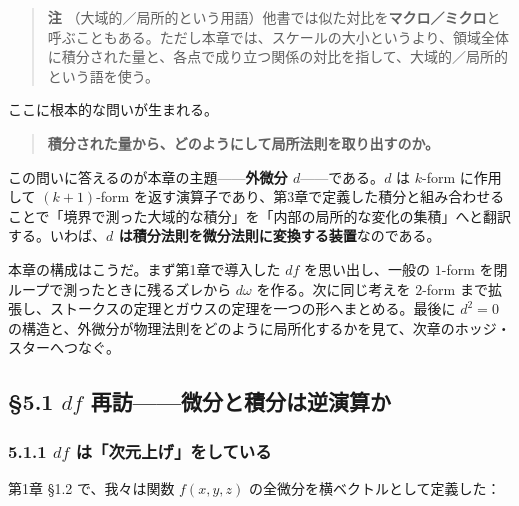 \documentclass[a4paper,12pt,openany]{book}
\begin{document}
\begin{quote}
\textbf{注}
（大域的／局所的という用語）他書では似た対比を\textbf{マクロ／ミクロ}と呼ぶこともある。ただし本章では、スケールの大小というより、領域全体に積分された量と、各点で成り立つ関係の対比を指して、大域的／局所的という語を使う。
\end{quote}

ここに根本的な問いが生まれる。

\begin{quote}
\textbf{積分された量から、どのようにして局所法則を取り出すのか。}
\end{quote}

この問いに答えるのが本章の主題——\textbf{外微分 $d$}——である。\(d\)
は \(k\)-form に作用して \((k+1)\)-form
を返す演算子であり、第3章で定義した積分と組み合わせることで「境界で測った大域的な積分」を「内部の局所的な変化の集積」へと翻訳する。いわば、\textbf{$d$ は積分法則を微分法則に変換する装置}なのである。

本章の構成はこうだ。まず第1章で導入した \(df\) を思い出し、一般の
\(1\)-form を閉ループで測ったときに残るズレから \(d\omega\)
を作る。次に同じ考えを \(2\)-form
まで拡張し、ストークスの定理とガウスの定理を一つの形へまとめる。最後に
\(d^2=0\)
の構造と、外微分が物理法則をどのように局所化するかを見て、次章のホッジ・スターへつなぐ。

\par\vspace{0.35em}\par

\hypertarget{df-ux518dux8a2aux5faeux5206ux3068ux7a4dux5206ux306fux9006ux6f14ux7b97ux304b}{%
\subsection{\texorpdfstring{§5.1 \(df\)
再訪——微分と積分は逆演算か}{§5.1 df 再訪——微分と積分は逆演算か}}\label{df-ux518dux8a2aux5faeux5206ux3068ux7a4dux5206ux306fux9006ux6f14ux7b97ux304b}}

\hypertarget{df-ux306fux6b21ux5143ux4e0aux3052ux3092ux3057ux3066ux3044ux308b}{%
\subsubsection{\texorpdfstring{5.1.1 \(df\)
は「次元上げ」をしている}{5.1.1 df は「次元上げ」をしている}}\label{df-ux306fux6b21ux5143ux4e0aux3052ux3092ux3057ux3066ux3044ux308b}}

第1章 §1.2 で、我々は関数 \(f(x,y,z)\)
の全微分を横ベクトルとして定義した：
\end{document}
